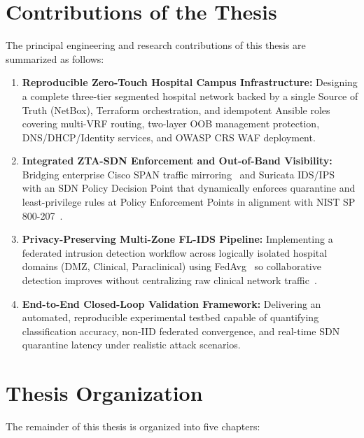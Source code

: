 \section{Contributions of the Thesis}
\label{sec:contributions}

The principal engineering and research contributions of this thesis are summarized as follows:

\begin{enumerate}[leftmargin=1.8em, itemsep=6pt]
  \item \textbf{Reproducible Zero-Touch Hospital Campus Infrastructure:} Designing a complete three-tier segmented hospital network backed by a single Source of Truth (NetBox), Terraform orchestration, and idempotent Ansible roles covering multi-VRF routing, two-layer OOB management protection, DNS/DHCP/Identity services, and OWASP CRS WAF deployment.
  \item \textbf{Integrated ZTA-SDN Enforcement and Out-of-Band Visibility:} Bridging enterprise Cisco SPAN traffic mirroring~\cite{ciscoSpan} and Suricata IDS/IPS~\cite{suricataIpsConcept} with an SDN Policy Decision Point that dynamically enforces quarantine and least-privilege rules at Policy Enforcement Points in alignment with NIST SP 800-207~\cite{rose2020zerotrust}.
  \item \textbf{Privacy-Preserving Multi-Zone FL-IDS Pipeline:} Implementing a federated intrusion detection workflow across logically isolated hospital domains (DMZ, Clinical, Paraclinical) using FedAvg~\cite{mcmahan2017communication} so collaborative detection improves without centralizing raw clinical network traffic~\cite{javeed2024federated,amiri2023sids}.
  \item \textbf{End-to-End Closed-Loop Validation Framework:} Delivering an automated, reproducible experimental testbed capable of quantifying classification accuracy, non-IID federated convergence, and real-time SDN quarantine latency under realistic attack scenarios.
\end{enumerate}

\section{Thesis Organization}
\label{sec:organization}

The remainder of this thesis is organized into five chapters:

